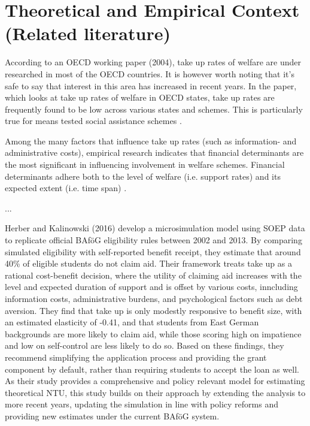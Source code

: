 \section{Theoretical and Empirical Context (Related literature)}
\label{section:theoretical_empirical_context}

According to an OECD working paper (2004), take up rates of welfare are under researched in most of the OECD countries. It is however worth noting that it’s safe to say that interest in this area has increased in recent years. In the paper, which looks at take up rates of welfare in OECD states, take up rates are frequently found to be low across various states and schemes. This is particularly true for means tested social assistance schemes \citep{hernanz_oecd_2004}.

Among the many factors that influence take up rates (such as information- and administrative costs), empirical research indicates that financial determinants are the most significant in influencing involvement in welfare schemes. Financial determinants adhere both to the level of welfare (i.e. support rates) and its expected extent (i.e. time span) \citep{hernanz_oecd_2004}.

...

Herber and Kalinowski (2016) develop a microsimulation model using SOEP data to replicate official BAföG eligibility rules between 2002 and 2013. By comparing simulated eligibility with self-reported benefit receipt, they estimate that around 40\% of eligible students do not claim aid. Their framework treats take up as a rational cost-benefit decision, where the utility of claiming aid increases with the level and expected duration of support and is offset by various costs, inncluding information costs, administrative burdens, and psychological factors such as debt aversion. They find that take up is only modestly responsive to benefit size, with an estimated elasticity of -0.41, and that students from East German backgrounds are more likely to claim aid, while those scoring high on impatience and low on self-control are less likely to do so. Based on these findings, they recommend simplifying the application process and providing the grant component by default, rather than requiring students to accept the loan as well. As their study provides a comprehensive and policy relevant model for estimating theoretical NTU, this study builds on their approach by extending the analysis to more recent years, updating the simulation in line with policy reforms and providing new estimates under the current BAföG system.

